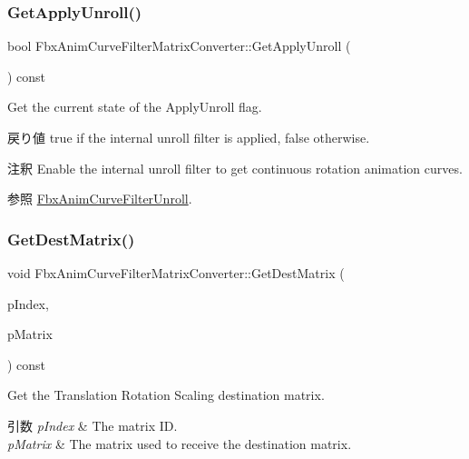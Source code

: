 \subsubsection{\texorpdfstring{Get\+Apply\+Unroll()}{GetApplyUnroll()}}
{\footnotesize\ttfamily bool Fbx\+Anim\+Curve\+Filter\+Matrix\+Converter\+::\+Get\+Apply\+Unroll (\begin{DoxyParamCaption}{ }\end{DoxyParamCaption}) const}

Get the current state of the Apply\+Unroll flag. \begin{DoxyReturn}{戻り値}
{\ttfamily true} if the internal unroll filter is applied, {\ttfamily false} otherwise. 
\end{DoxyReturn}
\begin{DoxyRemark}{注釈}
Enable the internal unroll filter to get continuous rotation animation curves. 
\end{DoxyRemark}
\begin{DoxySeeAlso}{参照}
\hyperlink{class_fbx_anim_curve_filter_unroll}{Fbx\+Anim\+Curve\+Filter\+Unroll}. 
\end{DoxySeeAlso}
\mbox{\label{class_fbx_anim_curve_filter_matrix_converter_a5cd3e587cb299a3ae2d78e9c964a5ef0}} 
\subsubsection{\texorpdfstring{Get\+Dest\+Matrix()}{GetDestMatrix()}}
{\footnotesize\ttfamily void Fbx\+Anim\+Curve\+Filter\+Matrix\+Converter\+::\+Get\+Dest\+Matrix (\begin{DoxyParamCaption}\item[{\hyperlink{class_fbx_anim_curve_filter_matrix_converter_a41638d5acd6d14ef0f095ab75b18ee69}{E\+Matrix\+Index}}]{p\+Index,  }\item[{\hyperlink{class_fbx_a_matrix}{Fbx\+A\+Matrix} \&}]{p\+Matrix }\end{DoxyParamCaption}) const}

Get the Translation Rotation Scaling destination matrix. 
\begin{DoxyParams}{引数}
{\em p\+Index} & The matrix ID. \\
\hline
{\em p\+Matrix} & The matrix used to receive the destination matrix. \\
\hline
\end{DoxyParams}
\mbox{\label{class_fbx_anim_curve_filter_matrix_converter_abeb4273e3155dd4644a35a68f39ebda3}} 
